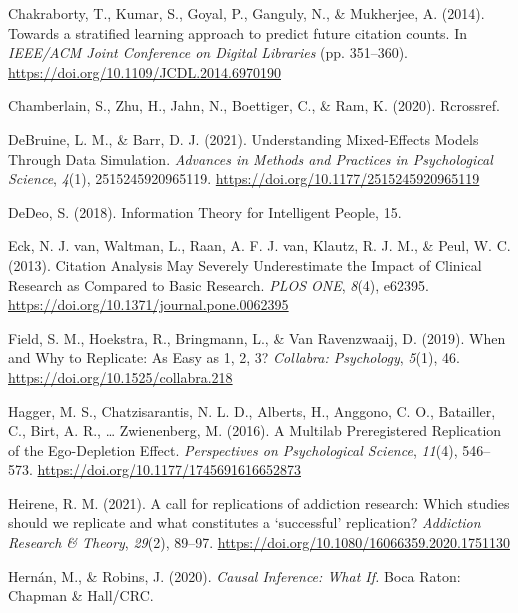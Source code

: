 \documentclass[
  english,
  man,floatsintext]{apa6}
\newlength{\cslhangindent}
\newlength{\cslentryspacingunit} %
\newenvironment{CSLReferences}[2] %
 {%
  \setlength{\parindent}{0pt}
  \ifodd #1
  \let\oldpar\par
  \def\par{\hangindent=\cslhangindent\oldpar}
  \fi
  \setlength{\parskip}{#2\cslentryspacingunit}
 }%
 {}
\begin{document}
\begin{CSLReferences}{1}{0}
\leavevmode{}%
Chakraborty, T., Kumar, S., Goyal, P., Ganguly, N., \& Mukherjee, A. (2014). Towards a stratified learning approach to predict future citation counts. In \emph{{IEEE}/{ACM Joint Conference} on {Digital Libraries}} (pp. 351--360). \url{https://doi.org/10.1109/JCDL.2014.6970190}

\leavevmode{}%
Chamberlain, S., Zhu, H., Jahn, N., Boettiger, C., \& Ram, K. (2020). Rcrossref.

\leavevmode{}%
DeBruine, L. M., \& Barr, D. J. (2021). Understanding {Mixed}-{Effects Models Through Data Simulation}. \emph{Advances in Methods and Practices in Psychological Science}, \emph{4}(1), 2515245920965119. \url{https://doi.org/10.1177/2515245920965119}

\leavevmode{}%
DeDeo, S. (2018). Information {Theory} for {Intelligent People}, 15.

\leavevmode{}%
Eck, N. J. van, Waltman, L., Raan, A. F. J. van, Klautz, R. J. M., \& Peul, W. C. (2013). Citation {Analysis May Severely Underestimate} the {Impact} of {Clinical Research} as {Compared} to {Basic Research}. \emph{PLOS ONE}, \emph{8}(4), e62395. \url{https://doi.org/10.1371/journal.pone.0062395}

\leavevmode{}%
Field, S. M., Hoekstra, R., Bringmann, L., \& Van Ravenzwaaij, D. (2019). When and {Why} to {Replicate}: {As Easy} as 1, 2, 3? \emph{Collabra: Psychology}, \emph{5}(1), 46. \url{https://doi.org/10.1525/collabra.218}

\leavevmode{}%
Hagger, M. S., Chatzisarantis, N. L. D., Alberts, H., Anggono, C. O., Batailler, C., Birt, A. R., \ldots{} Zwienenberg, M. (2016). A {Multilab Preregistered Replication} of the {Ego}-{Depletion Effect}. \emph{Perspectives on Psychological Science}, \emph{11}(4), 546--573. \url{https://doi.org/10.1177/1745691616652873}

\leavevmode{}%
Heirene, R. M. (2021). A call for replications of addiction research: Which studies should we replicate and what constitutes a {`successful'} replication? \emph{Addiction Research \& Theory}, \emph{29}(2), 89--97. \url{https://doi.org/10.1080/16066359.2020.1751130}

\leavevmode{}%
Hernán, M., \& Robins, J. (2020). \emph{Causal {Inference}: {What If}.} {Boca Raton}: {Chapman \& Hall/CRC}.


\end{CSLReferences}
\end{document}
